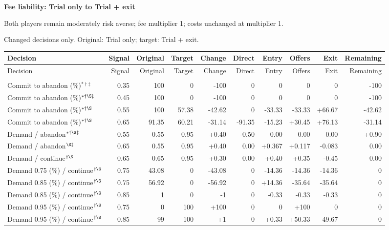 \documentclass[10pt]{article}
\begin{document}
{\large\bfseries Fee liability: Trial only to Trial + exit}\par
Both players remain moderately risk averse; fee multiplier 1; costs unchanged at multiplier 1.\par
{\small Changed decisions only. Original: Trial only; target: Trial + exit.}\par
{\small\setlength{\tabcolsep}{3pt}\begin{longtable}{@{}>{\raggedright\arraybackslash}p{1.65in}rrrrrrrrr@{}}
\toprule Decision & Signal & Original & Target & Change & Direct & Entry & Offers & Exit & Remaining \\\midrule\endfirsthead
\toprule Decision & Signal & Original & Target & Change & Direct & Entry & Offers & Exit & Remaining \\\midrule\endhead
\bottomrule\endfoot
\multicolumn{10}{@{}l}{\textbf{Plaintiff}}\\
Commit to abandon (\%)$^{*\dagger\ddagger}$ & 0.35 & 100 & 0 & -100 & 0 & 0 & 0 & 0 & -100\\
Commit to abandon (\%)$^{*\dagger\S\ddagger}$ & 0.45 & 100 & 0 & -100 & 0 & 0 & 0 & 0 & -100\\
Commit to abandon (\%)$^{*\dagger\S}$ & 0.55 & 100 & 57.38 & -42.62 & 0 & -33.33 & -33.33 & +66.67 & -42.62\\
Commit to abandon (\%)$^{*\dagger\S}$ & 0.65 & 91.35 & 60.21 & -31.14 & -91.35 & -15.23 & +30.45 & +76.13 & -31.14\\
Demand / abandon$^{*\dagger\S\ddagger}$ & 0.55 & 0.55 & 0.95 & +0.40 & -0.50 & 0.00 & 0.00 & 0.00 & +0.90\\
Demand / abandon$^{\S\ddagger}$ & 0.65 & 0.55 & 0.95 & +0.40 & 0.00 & +0.367 & +0.117 & -0.083 & 0.00\\
Demand / continue$^{\dagger\S}$ & 0.65 & 0.65 & 0.95 & +0.30 & 0.00 & +0.40 & +0.35 & -0.45 & 0.00\\
Demand 0.75 (\%) / continue$^{\dagger\S}$ & 0.75 & 43.08 & 0 & -43.08 & 0 & -14.36 & -14.36 & -14.36 & 0\\
Demand 0.85 (\%) / continue$^{\dagger\S}$ & 0.75 & 56.92 & 0 & -56.92 & 0 & +14.36 & -35.64 & -35.64 & 0\\
Demand 0.85 (\%) / continue$^{\dagger\S}$ & 0.85 & 1 & 0 & -1 & 0 & -0.33 & -0.33 & -0.33 & 0\\
Demand 0.95 (\%) / continue$^{\dagger\S}$ & 0.75 & 0 & 100 & +100 & 0 & 0 & +100 & 0 & 0\\
Demand 0.95 (\%) / continue$^{\dagger\S}$ & 0.85 & 99 & 100 & +1 & 0 & +0.33 & +50.33 & -49.67 & 0\\

\end{longtable}}
\end{document}
